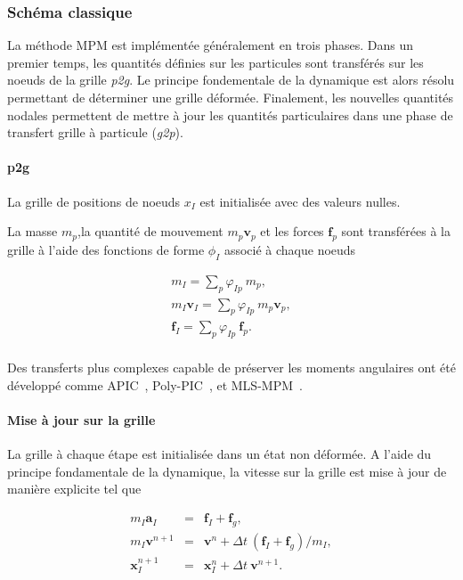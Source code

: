 \subsubsection{Schéma classique}

La méthode MPM est implémentée généralement en trois phases. Dans un premier temps, les quantités définies sur les particules sont transférés sur les noeuds de la grille \textit{p2g}. Le principe fondementale de la dynamique est alors résolu permettant de déterminer une grille déformée. Finalement, les nouvelles quantités nodales permettent de mettre à jour les quantités particulaires dans une phase de transfert grille à particule (\textit{g2p}).

\paragraph*{p2g}

La grille de positions de noeuds $x_I$ est initialisée avec des valeurs nulles.

La masse $m_p$,la quantité de mouvement $m_p \bm v_p$ et les forces $\bm f_p$ sont transférées à la grille à l'aide des fonctions de forme $\phi_I$ associé à chaque noeuds

\begin{eqnarray*}
    m_I = \sum_p \varphi_{Ip}~ m_p, \\
    m_I \bm v_I  =  \sum_p \varphi_{Ip}~ m_p \bm v_p, \\
    \bm f_I  =  \sum_p \varphi_{Ip}~  \bm f_p. \\
\end{eqnarray*}

Des transferts plus complexes capable de préserver les moments angulaires ont été développé comme APIC~\cite{jiang_affine_2015}, Poly-PIC~\cite{fu_polynomial_2017}, et MLS-MPM~\cite{hu_moving_2018}.

\paragraph*{Mise à jour sur la grille}
La grille à chaque étape est initialisée dans un état non déformée. A l'aide du principe fondamentale de la dynamique, la vitesse sur la grille est mise à jour de manière explicite tel que

\begin{eqnarray*}
    m_I \bm a_I &=& \bm f_I + \bm f_g, \\
    m_I \bm v^{n+1} &=& \bm v^{n} + \Delta t~ (\bm f_I + \bm f_g) / m_I, \\
    \bm x_I^{n+1} &=& \bm x_I^{n} + \Delta t~\bm v^{n+1}.
\end{eqnarray*}

